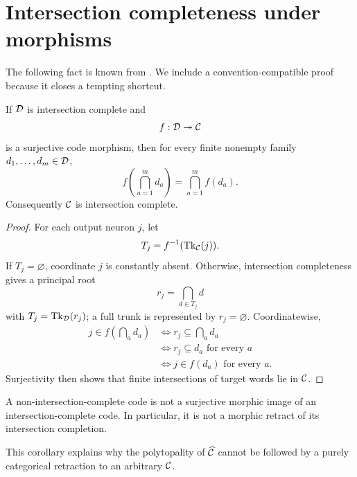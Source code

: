 \section{Intersection completeness under morphisms}
\label{app:intersection-morphisms}

The following fact is known from \citet[Theorem~1.5]{Jeffs2020}.  We include a convention-compatible proof because it closes a tempting shortcut.

\begin{proposition}
If $\mathcal D$ is intersection complete and
\[
 f:\mathcal D\twoheadrightarrow\mathcal C
\]
is a surjective code morphism, then for every finite nonempty family $d_1,\ldots,d_m\in\mathcal D$,
\[
 f\left(\bigcap_{a=1}^m d_a\right)
 =\bigcap_{a=1}^m f(d_a).
\]
Consequently $\mathcal C$ is intersection complete.
\end{proposition}

\begin{proof}
For each output neuron $j$, let
\[
 T_j=f^{-1}(\operatorname{Tk}_\mathcal C(j)).
\]
If $T_j=\varnothing$, coordinate $j$ is constantly absent.  Otherwise, intersection completeness gives a principal root
\[
 r_j=\bigcap_{d\in T_j}d
\]
with $T_j=\operatorname{Tk}_\mathcal D(r_j)$; a full trunk is represented by $r_j=\varnothing$.  Coordinatewise,
\[
 \begin{aligned}
 j\in f(\bigcap_a d_a)
 &\Longleftrightarrow r_j\subseteq\bigcap_a d_a\\
 &\Longleftrightarrow r_j\subseteq d_a\text{ for every }a\\
 &\Longleftrightarrow j\in f(d_a)\text{ for every }a.
 \end{aligned}
\]
Surjectivity then shows that finite intersections of target words lie in $\mathcal C$.
\end{proof}

\begin{corollary}
A non-intersection-complete code is not a surjective morphic image of an intersection-complete code.  In particular, it is not a morphic retract of its intersection completion.
\end{corollary}

This corollary explains why the polytopality of $\widehat{\mathcal C}$ cannot be followed by a purely categorical retraction to an arbitrary $\mathcal C$.
